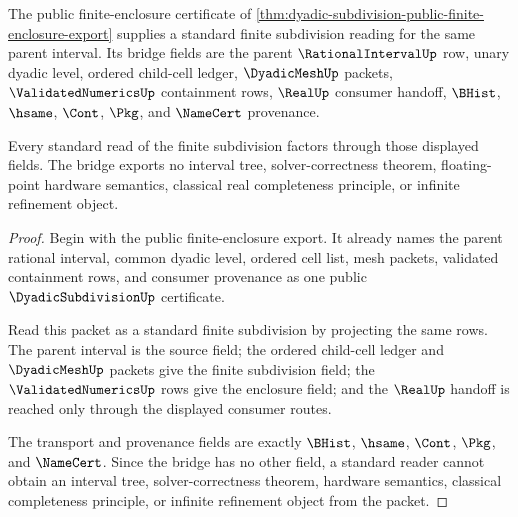 \begin{theorem}
\label{thm:dyadic-subdivision-standard-bridge-certificate}
The public finite-enclosure certificate of \autoref{thm:dyadic-subdivision-public-finite-enclosure-export} supplies a standard finite subdivision reading for the same parent interval. Its bridge fields are the parent $\RationalIntervalUp$ row, unary dyadic level, ordered child-cell ledger, $\DyadicMeshUp$ packets, $\ValidatedNumericsUp$ containment rows, $\RealUp$ consumer handoff, $\BHist$, $\hsame$, $\Cont$, $\Pkg$, and $\NameCert$ provenance.

Every standard read of the finite subdivision factors through those displayed fields. The bridge exports no interval tree, solver-correctness theorem, floating-point hardware semantics, classical real completeness principle, or infinite refinement object.
\end{theorem}
\begin{proof}
Begin with the public finite-enclosure export. It already names the parent rational interval, common dyadic level, ordered cell list, mesh packets, validated containment rows, and consumer provenance as one public $\DyadicSubdivisionUp$ certificate.

Read this packet as a standard finite subdivision by projecting the same rows. The parent interval is the source field; the ordered child-cell ledger and $\DyadicMeshUp$ packets give the finite subdivision field; the $\ValidatedNumericsUp$ rows give the enclosure field; and the $\RealUp$ handoff is reached only through the displayed consumer routes.

The transport and provenance fields are exactly $\BHist$, $\hsame$, $\Cont$, $\Pkg$, and $\NameCert$. Since the bridge has no other field, a standard reader cannot obtain an interval tree, solver-correctness theorem, hardware semantics, classical completeness principle, or infinite refinement object from the packet.
\end{proof}


